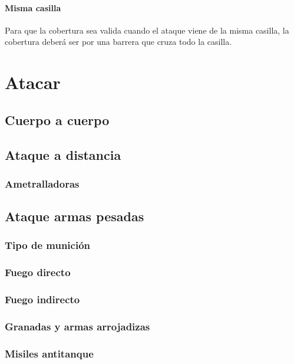     \paragraph{Misma casilla}
    Para que la cobertura sea valida cuando el ataque viene de la misma casilla, la cobertura deberá ser por una barrera que cruza todo la casilla.

\section{Atacar}

    \subsection{Cuerpo a cuerpo} \label{page:retreat}

    \subsection{Ataque a distancia}

        \subsubsection{Ametralladoras}

    \subsection{Ataque armas pesadas}

        \subsubsection{Tipo de munición}

        \subsubsection{Fuego directo}

        \subsubsection{Fuego indirecto}

        \subsubsection{Granadas y armas arrojadizas}

        \subsubsection{Misiles antitanque}

